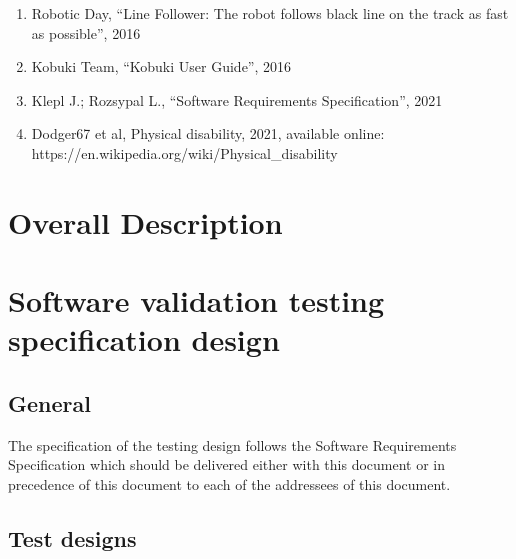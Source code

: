 \begin{enumerate}
    \item \label{rules} Robotic Day, ``Line Follower: The robot follows black line on the track as fast as possible'', 2016
    \item \label{guide} Kobuki Team, ``Kobuki User Guide'', 2016
    \item \label{guide} Klepl J.; Rozsypal L., ``Software Requirements Specification'', 2021
    \item \label{disability} Dodger67 et al, Physical disability, 2021, available online:\\ https://en.wikipedia.org/wiki/Physical\_disability
\end{enumerate}

\chapter{Overall Description}
\label{Overall Description}

\chapter{Software validation testing specification design}
\label{Requirements}

\section{General}

The specification of the testing design follows the Software Requirements Specification which should be delivered either with this document or in precedence of this document to each of the addressees of this document.

\section{Test designs}


\def\srs#1#2#3#4#5{\item\textbf{Test design \textit{#1}}

\textbf{General}:

This test design establishes procedures for the validation on the #3 as specified in the Software Requirements Specification (as \textbf{SRS\_#2}).

\textbf{Features to be tested}:

This test design will test the following features: #4

\textbf{Approach refinements}:

#5

}

